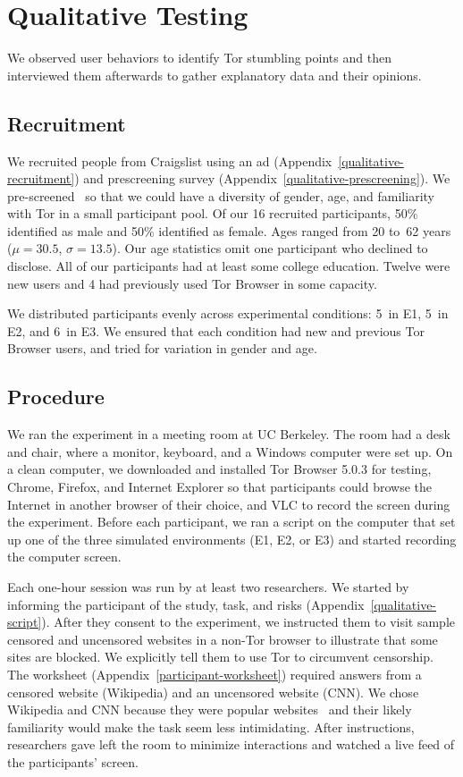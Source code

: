 \documentclass[USenglish,oneside,twocolumn]{article}
\begin{document}
\section{Qualitative Testing}
\label{sec:qualitative}
We observed user behaviors to identify Tor stumbling points and then interviewed them afterwards to gather explanatory data and their opinions. 

\subsection{Recruitment}
We recruited people from Craigslist using an ad (Appendix~\ref{qualitative-recruitment}) and prescreening survey (Appendix~\ref{qualitative-prescreening}). We pre-screened~\cite{screening} so that we could have a diversity of gender, age, and familiarity with Tor in a small participant pool. Of our 16 recruited participants, 50\% identified as male and 50\% identified as female. Ages ranged from 20 to~62 years ($\mu = 30.5$, $\sigma = 13.5$). Our age statistics omit one participant who declined to disclose. All of our participants had at least some college education. Twelve were new users and 4 had previously used Tor Browser in some capacity.  



We distributed participants evenly across experimental conditions:  5~in E1, 5~in E2, and 6~in E3. We ensured that each condition had new and previous Tor Browser users, and tried for variation in gender and age.

\subsection{Procedure} 
We ran the experiment in a meeting room at UC Berkeley. The room had a desk and chair, where a monitor, keyboard, and a Windows computer were set up. On a clean computer, we downloaded and installed Tor Browser 5.0.3 for testing, Chrome, Firefox, and Internet Explorer so that participants could browse the Internet in another browser of their choice, and VLC to record the screen during the experiment. Before each participant, we ran a script on the computer that set up one of the three simulated environments (E1, E2, or E3) and started recording the computer screen.  

Each one-hour session was run by at least two researchers. We started by informing the participant of the study, task, and risks (Appendix~\ref{qualitative-script}). After they consent to the experiment, we instructed them to visit sample censored and uncensored websites in a non-Tor browser to illustrate that some sites are blocked. We explicitly tell them to use Tor to circumvent censorship. The worksheet (Appendix~\ref{participant-worksheet}) required answers from a censored website (Wikipedia) and an uncensored website (CNN). We chose Wikipedia and CNN because they were popular websites~\cite{alexa} and their likely familiarity would make the task seem less intimidating. After instructions, researchers gave left the room to minimize interactions and watched a live feed of the participants' screen.
\end{document}
